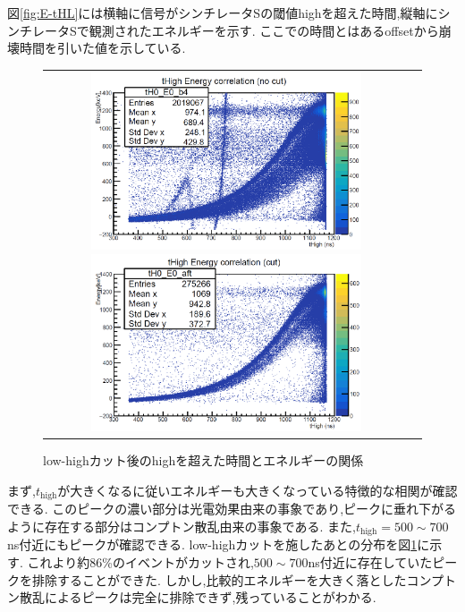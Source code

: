 図\ref{fig:E-tHL}には横軸に信号がシンチレータSの閾値highを超えた時間,縦軸にシンチレータSで観測されたエネルギーを示す.
ここでの時間とはあるoffsetから崩壊時間を引いた値を示している.
\begin{figure}[H]
	\begin{tabular}{cc}
		\begin{minipage}{0.5\hsize}
			\centering
				\includegraphics[width=80mm]{fig/isb/E-tHL.pdf}
				\caption{閾値highを超えた時間とエネルギーの関係}
				\label{fig:E-tHL}
		\end{minipage}
		\begin{minipage}{0.5\hsize}
			\centering
				\includegraphics[width=80mm]{fig/isb/E-tHL_cut.pdf}
				\caption{low-highカット後のhighを超えた時間とエネルギーの関係}
				\label{fig:E-tHL_cut}
		\end{minipage}
	\end{tabular}
\end{figure}
まず,$t_\textrm{high}$が大きくなるに従いエネルギーも大きくなっている特徴的な相関が確認できる.
このピークの濃い部分は光電効果由来の事象であり,ピークに垂れ下がるように存在する部分はコンプトン散乱由来の事象である.
また,$t_\textrm{high}=500\sim700$ns付近にもピークが確認できる.
low-highカットを施したあとの分布を図\ref{fig:E-tHL_cut}に示す.
これより約86\%のイベントがカットされ,$500\sim700$ns付近に存在していたピークを排除することができた.
しかし,比較的エネルギーを大きく落としたコンプトン散乱によるピークは完全に排除できず,残っていることがわかる.

